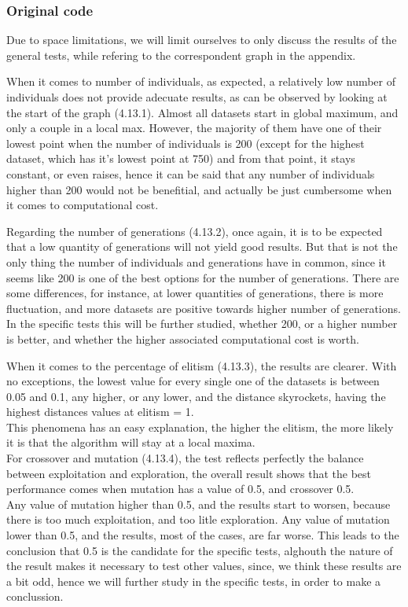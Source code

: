 \subsubsection{Original code}

Due to space limitations, we will limit ourselves to only discuss the results
of the general tests, while refering to the correspondent graph in the
appendix. 

When it comes to number of individuals, as expected, a relatively low number
of individuals does not provide adecuate results, as can be observed by looking
at the start of the graph (4.13.1). Almost all datasets start in global maximum, and only
a couple in a local max. However, the majority of them have one of their
lowest point when the number of individuals is 200 (except for the highest
dataset, which has it's lowest point at 750) and from that point, it stays
constant, or even raises, hence it can be said that any number of individuals higher than 200
would not be benefitial, and actually be just cumbersome when it comes to
computational cost.

Regarding the number of generations (4.13.2), once again, it is to be expected that a
low quantity of generations will not yield good results. But that is not the
only thing the number of individuals and generations have in common, since it
seems like 200 is one of the best options for the number of generations.
There are some differences, for instance, at lower quantities of
generations, there is more fluctuation, and more datasets are positive
towards higher number of generations. In the specific tests this will be
further studied, whether 200, or a higher number is better, and whether the
higher associated computational cost is worth.

When it comes to the percentage of elitism (4.13.3), the results are clearer.
With no exceptions, the lowest value for every single one of the datasets
is between 0.05 and 0.1, any higher, or any lower, and the distance
skyrockets, having the highest distances values at elitism = 1. \\
This phenomena has an easy explanation, the higher the elitism, the more likely it is that the
algorithm will stay at a local maxima. \\

For crossover and mutation (4.13.4), the test reflects perfectly the balance between exploitation and
exploration, the overall result shows that the best performance comes when
mutation has a value of 0.5, and crossover 0.5.\\
Any value of mutation higher than 0.5, and the results start to worsen, because
there is too much exploitation, and too litle exploration. Any value of mutation
lower than 0.5, and the results, most of the cases, are far worse. This leads to
the conclusion that 0.5 is the candidate for the specific tests, alghouth
the nature of the result makes it necessary to test other values, since,
we think these results are a bit odd, hence we will further
study in the specific tests, in order to make a conclussion.

